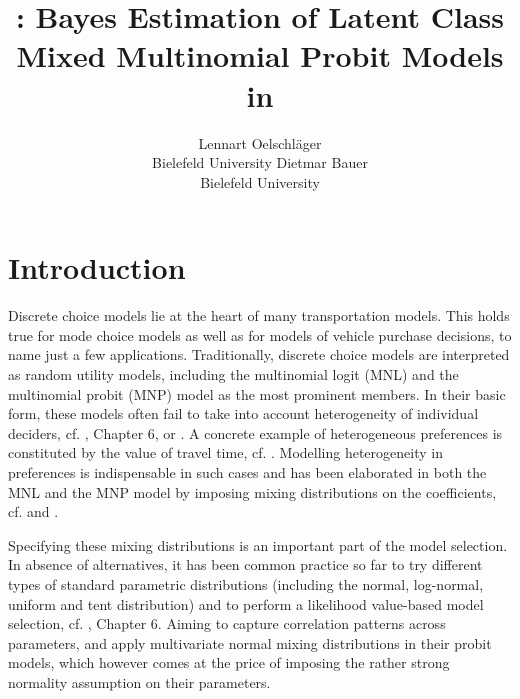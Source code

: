 \documentclass[article]{jss}
\author{Lennart Oelschl\"ager\\Bielefeld University
   \And Dietmar Bauer\\Bielefeld University}
\title{\pkg{RprobitB}: Bayes Estimation of Latent Class Mixed Multinomial Probit Models in \proglang{R}}
\newcommand{\fct}[1]{\code{#1()}}
\begin{document}




\section{Introduction}
\label{sec:intro}

Discrete choice models lie at the heart of many transportation models. This holds true for mode choice models as well as for models of vehicle purchase decisions, to name just a few applications.
Traditionally, discrete choice models are interpreted as random utility models, including the multinomial logit (MNL) and the multinomial probit (MNP) model as the most prominent members.
In their basic form, these models often fail to take into account heterogeneity of individual deciders, cf. \cite{Train:09}, Chapter 6, or \cite{Train:16}. A concrete example of heterogeneous preferences is constituted by the value of travel time, cf. \cite{Cirillo:06}. Modelling heterogeneity in preferences is indispensable in such cases and has been elaborated in both the MNL and the MNP model by imposing mixing distributions on the coefficients, cf. \cite{Train:09} and \cite{Bhat:11}.

Specifying these mixing distributions is an important part of the model selection. In absence of alternatives, it has been common practice so far to try different types of standard parametric distributions (including the normal, log-normal, uniform and tent distribution) and to perform a likelihood value-based model selection, cf. \cite{Train:09}, Chapter 6. Aiming to capture correlation patterns across parameters, \cite{Fountas:18} and \cite{Fountas:19} apply multivariate normal mixing distributions in their probit models, which however comes at the price of imposing the rather strong normality assumption on their parameters.
\end{document}
